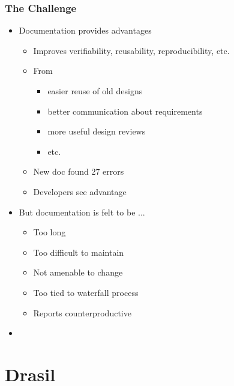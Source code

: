 \documentclass{beamer}
\begin{document}
\begin{frame}

\frametitle{The Challenge}

\begin{itemize}
\item Documentation provides advantages
\begin{itemize}
\item Improves verifiability, reusability, reproducibility, etc.
\item From \cite{Parnas2010}
\begin{itemize}
\item easier reuse of old designs
\item better communication about requirements
\item more
  useful design reviews
\item etc.
\end{itemize}
\item New doc found 27 errors \citep{SmithAndKoothoor2016}
\item Developers see advantage \citep{SmithJegatheesanAndKelly2016}
\end{itemize}
\item But documentation is felt to be ...
\begin{itemize}
\item Too long
\item Too difficult to maintain
\item Not amenable to change
\item Too tied to waterfall process
\item Reports counterproductive \citep{Roache1998}
\end{itemize}
\item {}
\end{itemize}

\end{frame}


\section[Drasil]{Drasil}

\end{document}
